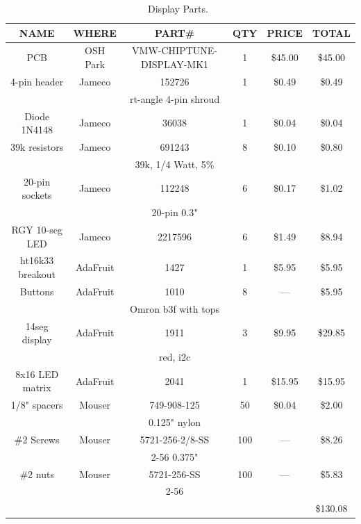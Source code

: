 \documentclass[11pt]{article}
\begin{document}
\begin{table}

\caption{Display Parts.~\label{table:display_parts}}
\centering
\begin{tabular}{|c|c|c|c|c|c|}
\hline
NAME		& WHERE		& PART\#	           & QTY & PRICE    & TOTAL \\
\hline
\hline
PCB		& OSH Park	& VMW-CHIPTUNE-DISPLAY-MK1 & 1	 & \$45.00  & \$45.00 \\
\hline
4-pin header	& Jameco	& 152726                   & 1	 & \$0.49   &  \$0.49 \\
		&		& rt-angle 4-pin shroud	   &	 &          &         \\
\hline
Diode 1N4148	& Jameco	& 36038		           & 1	 & \$0.04   &  \$0.04 \\
\hline
39k resistors	& Jameco	& 691243		   & 8   &  \$0.10  &  \$0.80 \\
		&		& 39k, 1/4 Watt, 5\%	   &     &          &         \\
\hline
20-pin sockets	& Jameco	& 112248		   & 6	 &  \$0.17  &  \$1.02 \\
		&		& 20-pin 0.3"		   &     &          &         \\
\hline
RGY 10-seg LED	& Jameco	& 2217596		   & 6	 &  \$1.49  &  \$8.94 \\
\hline
ht16k33 breakout	& AdaFruit	& 1427		           & 1	 & \$5.95   &  \$5.95 \\
\hline
Buttons		& AdaFruit	& 1010			   & 8	 & ---	    &  \$5.95 \\
		&		& Omron b3f with tops	   &     &          &         \\
\hline
14seg display	& AdaFruit	& 1911			   & 3	 & \$9.95   & \$29.85 \\
		&		& red, i2c		   &	 &          &	      \\  
\hline
8x16 LED matrix	& AdaFruit	& 2041			   & 1	 & \$15.95  & \$15.95 \\
\hline

1/8" spacers	& Mouser	& 749-908-125		   & 50  & \$0.04   & \$2.00  \\
		& 		& 0.125" nylon		   &     &          &         \\
\hline
\#2 Screws	& Mouser	& 5721-256-2/8-SS	   & 100 & --- 	    & \$8.26  \\
		&		& 2-56 0.375"		   &     &          &         \\
\hline
\#2 nuts	& Mouser	& 5721-256-SS	   	   & 100 & --- 	    & \$5.83  \\
		&		& 2-56		   	   &     &          &         \\
\hline
\hline
		&		&		&	&		& \$130.08 \\
\hline
\end{tabular}
\end{table}
\end{document}
